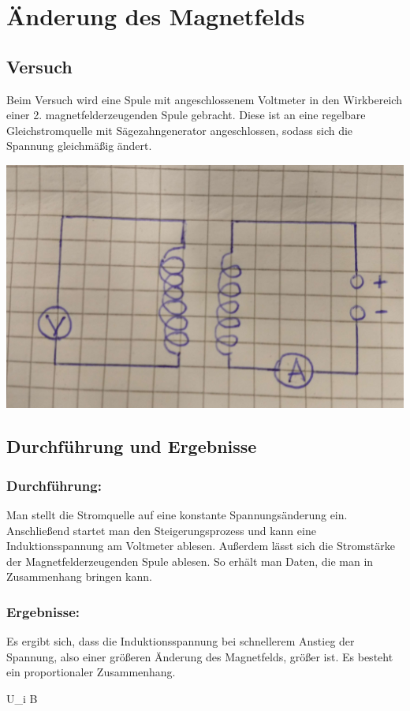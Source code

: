 \section{Änderung des Magnetfelds}

\subsection{Versuch}

\begin{multicols}{2}
    Beim Versuch wird eine Spule mit angeschlossenem Voltmeter in den Wirkbereich
    einer 2. magnetfelderzeugenden Spule gebracht. Diese ist an eine regelbare
    Gleichstromquelle mit Sägezahngenerator angeschlossen, sodass sich die
    Spannung gleichmäßig ändert.

    \columnbreak
    \begin{center}
        \includegraphics[width=.4\textwidth]{./images/induktion_versuch_spulen_haendisch.jpg}
    \end{center}

\end{multicols}

\subsection{Durchführung und Ergebnisse}

\begin{multicols}{2}

    \subsubsection{Durchführung:}

    Man stellt die Stromquelle auf eine konstante Spannungsänderung ein.
    Anschließend startet man den Steigerungsprozess und kann eine Induktionsspannung
    am Voltmeter ablesen. Außerdem lässt sich die Stromstärke der Magnetfelderzeugenden
    Spule ablesen. So erhält man Daten, die man in Zusammenhang bringen kann.
    \columnbreak

    \subsubsection{Ergebnisse:}
    Es ergibt sich, dass die Induktionsspannung bei schnellerem Anstieg der Spannung,
    also einer größeren Änderung des Magnetfelds, größer ist.
    Es besteht ein proportionaler Zusammenhang.

    \begin{formulas}
        U_{i} \propto \Delta B
    \end{formulas}

\end{multicols}

